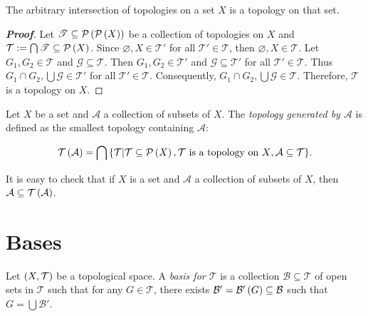\begin{proposition}
  The arbitrary intersection of topologies on a set $X$ is a topology on that set. 
  \begin{proof}[\rm\textbf{Proof}]
    Let $\mathscr{T}\subseteq\mathcal{P}\left(\mathcal{P}\left(X\right)\right)$ be a collection of topologies on $X$ and $\mathcal{T}:=\bigcap{\mathscr{T}}\subseteq\mathcal{P}\left(X\right)$. Since $\varnothing,X\in\mathcal{T}'$ for all $\mathcal{T}'\in\mathscr{T}$, then $\varnothing,X\in\mathcal{T}$. Let $G_1,G_2\in\mathcal{T}$ and $\mathcal{G}\subseteq\mathcal{T}$. Then $G_1,G_2\in\mathcal{T}'$ and $\mathcal{G}\subseteq\mathcal{T}'$ for all $\mathcal{T}'\in\mathscr{T}$. Thus $G_1\cap G_2,\bigcup{\mathcal{G}}\in\mathcal{T}'$ for all $\mathcal{T}'\in\mathscr{T}$. Consequently, $G_1\cap G_2,\bigcup{\mathcal{G}}\in\mathcal{T}$. Therefore, $\mathcal{T}$ is a topology on $X$.
  \end{proof}
\end{proposition}

\begin{definition}
  Let $X$ be a set and $\mathcal{A}$ a collection of subsets of $X$. The \emph{topology generated by $\mathcal{A}$} is defined as the smallest topology containing $\mathcal{A}$:

  \begin{equation}
    \mathcal{T}\left(\mathcal{A}\right)=\bigcap{\left\{\mathcal{T}\middle|\mathcal{T}\subseteq\mathcal{P}\left(X\right),\mathcal{T}\text{ is a topology on $X$},\mathcal{A}\subseteq\mathcal{T}\right\}}.
  \end{equation}
\end{definition}

\begin{remark}
  It is easy to check that if $X$ is a set and $\mathcal{A}$ a collection of subsets of $X$, then $\mathcal{A}\subseteq\mathcal{T}\left(\mathcal{A}\right)$.
\end{remark}

\section{Bases}

\begin{definition}
  Let $\left(X,\mathcal{T}\right)$ be a topological space. A \emph{basis for $\mathcal{T}$} is a collection $\mathcal{B}\subseteq\mathcal{T}$ of open sets in $\mathcal{T}$ such that for any $G\in\mathcal{T}$, there exists $\mathcal{B}'=\mathcal{B}'\left(G\right)\subseteq\mathcal{B}$ such that $G=\bigcup{\mathcal{B}'}$.
\end{definition}

